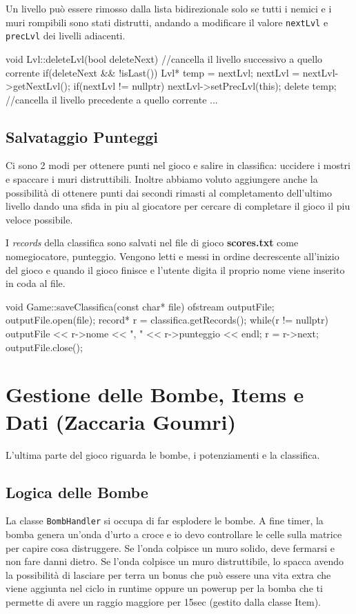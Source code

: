 \documentclass[11pt,a4paper]{article}
\begin{document}
Un livello può essere rimosso dalla lista bidirezionale solo se tutti i nemici e i muri rompibili sono stati distrutti, andando a modificare il valore \texttt{nextLvl} e \texttt{precLvl} dei livelli adiacenti.

\begin{codesnap}
void Lvl::deleteLvl(bool deleteNext) {
  //cancella il livello successivo a quello corrente
  if(deleteNext && !isLast()) {
    Lvl* temp = nextLvl;
    nextLvl = nextLvl->getNextLvl();
    if(nextLvl != nullptr) nextLvl->setPrecLvl(this);
    delete temp;
  }
  //cancella il livello precedente a quello corrente
  ...
}
\end{codesnap}

\subsection{Salvataggio Punteggi}
Ci sono 2 modi per ottenere punti nel gioco e salire in classifica: uccidere i mostri e spaccare i muri distruttibili. Inoltre abbiamo voluto aggiungere anche la possibilità di ottenere punti dai secondi rimasti al completamento dell'ultimo livello dando una sfida in piu al giocatore per cercare di completare il gioco il piu veloce possibile.

I \textit{records} della classifica sono salvati nel file di gioco \textbf{scores.txt} come nomegiocatore, punteggio. Vengono letti e messi in ordine decrescente all'inizio del gioco e quando il gioco finisce e l'utente digita il proprio nome viene inserito in coda al file.
\begin{codesnap}
void Game::saveClassifica(const char* file){
  ofstream outputFile;
  outputFile.open(file);
  record* r = classifica.getRecords();
  while(r != nullptr){
    outputFile << r->nome << ", " << r->punteggio << endl;
    r = r->next;
  }
  outputFile.close();
}
\end{codesnap}


\newpage
\section{Gestione delle Bombe, Items e Dati (Zaccaria Goumri)}
L'ultima parte del gioco riguarda le bombe, i potenziamenti e la classifica.

\subsection{Logica delle Bombe}
La classe \texttt{BombHandler} si occupa di far esplodere le bombe. A fine timer, la bomba genera un'onda d'urto a croce e io devo controllare le celle sulla matrice per capire cosa distruggere. Se l'onda colpisce un muro solido, deve fermarsi e non fare danni dietro. Se l'onda colpisce un muro distruttibile, lo spacca avendo la possibilit\`a di lasciare per terra un bonus che pu\`o essere una vita extra che viene aggiunta nel ciclo in runtime oppure un powerup per la bomba che ti permette di avere un raggio maggiore per 15sec (gestito dalla classe Item).
\end{document}
